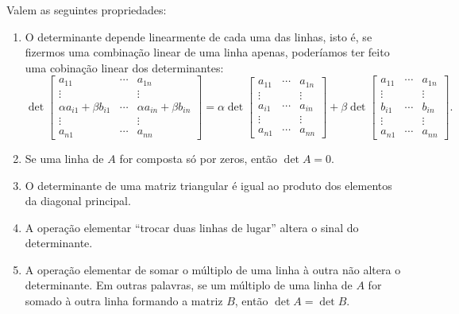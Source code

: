 \documentclass[../livro.tex]{subfiles}  %
\begin{document}
\begin{theorem}\label{thm:prop-det}
Valem as seguintes propriedades:
\begin{enumerate}[$(i)$]
\item O determinante depende linearmente de cada uma das linhas, isto é, se fizermos uma combinação linear de uma linha apenas, poderíamos ter feito uma cobinação linear dos determinantes:
\begin{equation}
\det \begin{bmatrix}
a_{11} & \cdots & a_{1n} \\
\vdots &  & \vdots \\
\alpha a_{i1} + \beta b_{i1}  & \cdots & \alpha a_{in} + \beta b_{in} \\
\vdots &  & \vdots \\
a_{n1} & \cdots & a_{nn}
\end{bmatrix} = 
\alpha \det \begin{bmatrix}
a_{11} & \cdots & a_{1n} \\
\vdots &  & \vdots \\
a_{i1} & \cdots & a_{in} \\
\vdots &  & \vdots \\
a_{n1} & \cdots & a_{nn}
\end{bmatrix} + \beta 
\det \begin{bmatrix}
a_{11} & \cdots & a_{1n} \\
\vdots &  & \vdots \\
b_{i1} & \cdots & b_{in} \\
\vdots &  & \vdots \\
a_{n1} & \cdots & a_{nn}
\end{bmatrix}.
\end{equation}

\item Se uma linha de $A$ for composta só por zeros, então $\det A = 0$.

\item O determinante de uma matriz triangular é igual ao produto dos elementos da diagonal principal.

\item A operação elementar ``trocar duas linhas de lugar'' altera o sinal do determinante.

\item A operação elementar de somar o múltiplo de uma linha à outra não altera o determinante. Em outras palavras, se um múltiplo de uma linha de $A$ for somado à outra linha formando a matriz $B$, então $\det A = \det B$.


\end{enumerate}
\end{theorem}
\end{document}
